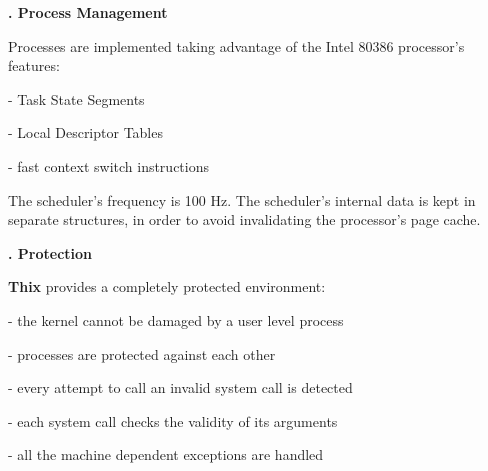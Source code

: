 \begin{slide}{}


{\small \bf {}. Process Management\\
}

\vspace{2cm}

{\tiny Processes are implemented taking advantage of the Intel 80386
processor's features:

\hspace{1cm} - Task State Segments

\hspace{1cm} - Local Descriptor Tables

\hspace{1cm} - fast context switch instructions

The scheduler's frequency is 100 Hz.  The scheduler's internal data
is kept in separate structures, in order to avoid invalidating the
processor's page cache.

\vspace{2cm}

{\small \bf {}. Protection\\
}

\vspace{2cm}

{\bf Thix} provides a completely protected environment:

\hspace{1cm} - the kernel cannot be damaged by a user level process

\hspace{1cm} - processes are protected against each other

\hspace{1cm} - every attempt to call an invalid system call is detected

\hspace{1cm} - each system call checks the validity of its arguments

\hspace{1cm} - all the machine dependent exceptions are handled


}

\end{slide}
